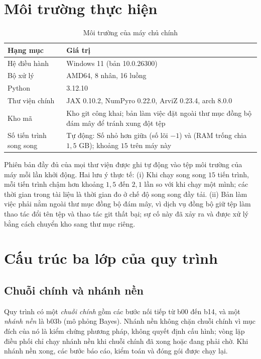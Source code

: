 \documentclass[12pt,a4paper]{article}
\theoremstyle{remark}
\begin{document}
\section{Môi trường thực hiện}

\begin{table}[h]
\centering
\caption{Môi trường của máy chủ chính}\label{tab:moitruong}
\begin{tabular}{@{}lp{9.4cm}@{}}
\toprule
\textbf{Hạng mục} & \textbf{Giá trị} \\
\midrule
Hệ điều hành & Windows 11 (bản 10.0.26300) \\
Bộ xử lý & AMD64, 8 nhân, 16 luồng \\
Python & 3.12.10 \\
Thư viện chính & JAX 0.10.2, NumPyro 0.22.0, ArviZ 0.23.4, arch 8.0.0 \\
Kho mã & Kho git công khai; bản làm việc đặt ngoài thư mục đồng bộ đám mây để tránh xung đột tệp \\
Số tiến trình song song & Tự động: Số nhỏ hơn giữa (số lõi $-1$) và (RAM trống chia $1{,}5$ GB); khoảng $15$ trên máy này \\
\bottomrule
\end{tabular}
\end{table}

Phiên bản đầy đủ của mọi thư viện được ghi tự động vào tệp môi trường của máy mỗi lần khởi động. Hai lưu ý thực tế: (i) Khi chạy song song $15$ tiến trình, mỗi tiến trình chậm hơn khoảng $1{,}5$ đến $2{,}1$ lần so với khi chạy một mình; các thời gian trong tài liệu là thời gian đo ở chế độ song song đầy tải. (ii) Bản làm việc phải nằm ngoài thư mục đồng bộ đám mây, vì dịch vụ đồng bộ giữ tệp làm thao tác đổi tên tệp và thao tác git thất bại; sự cố này đã xảy ra và được xử lý bằng cách chuyển kho sang thư mục riêng.

\section{Cấu trúc ba lớp của quy trình}

\subsection{Chuỗi chính và nhánh nền}

Quy trình có một \emph{chuỗi chính} gồm các bước nối tiếp từ b00 đến b14, và một \emph{nhánh nền} là b03b (mô phỏng Bayes). Nhánh nền không chặn chuỗi chính vì mục đích của nó là kiểm chứng phương pháp, không quyết định cấu hình; vòng lặp điều phối chỉ chạy nhánh nền khi chuỗi chính đã xong hoặc đang phải chờ. Khi nhánh nền xong, các bước báo cáo, kiểm toán và đóng gói được chạy lại.
\end{document}
